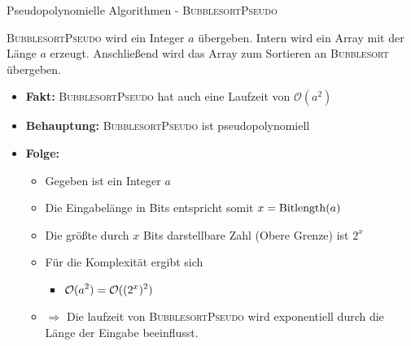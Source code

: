 \begin{frame}{Pseudopolynomielle Algorithmen - \textsc{BubblesortPseudo}}
	
	\textsc{BubblesortPseudo} wird ein Integer $a$ übergeben. Intern wird ein Array mit der Länge $a$ erzeugt. Anschließend wird das Array zum Sortieren an \textsc{Bubblesort} übergeben.
	
	\begin{itemize}
		
		\item \textbf{Fakt:} \textsc{BubblesortPseudo} hat auch eine Laufzeit von $\mathcal{O}(a^2)$
		\item \textbf{Behauptung:} \textsc{BubblesortPseudo} ist pseudopolynomiell
		\pause
		\item \textbf{Folge:} 
		\begin{itemize}
			\item Gegeben ist ein Integer $a$ 
			\item Die Eingabelänge in Bits entspricht somit $x = \operatorname{Bitlength}(a)$
			\item Die größte durch $x$ Bits darstellbare Zahl (Obere Grenze) ist $2^x$
			\item Für die Komplexität ergibt sich
			\begin{itemize}
				\item $\displaystyle \mathcal{O}(a^2) = \mathcal{O}((2^x)^2)$
			\end{itemize}
			\item[] $\Rightarrow$ Die laufzeit von \textsc{BubblesortPseudo} wird exponentiell durch die Länge der Eingabe beeinflusst. 
		\end{itemize}
	\end{itemize}
\end{frame}

